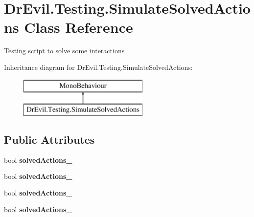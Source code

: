 \hypertarget{class_dr_evil_1_1_testing_1_1_simulate_solved_actions}{}\section{Dr\+Evil.\+Testing.\+Simulate\+Solved\+Actions Class Reference}
\label{class_dr_evil_1_1_testing_1_1_simulate_solved_actions}


\mbox{\hyperlink{namespace_dr_evil_1_1_testing}{Testing}} script to solve some interactions  


Inheritance diagram for Dr\+Evil.\+Testing.\+Simulate\+Solved\+Actions\+:\begin{figure}[H]
\begin{center}
\leavevmode
\includegraphics[height=2.000000cm]{class_dr_evil_1_1_testing_1_1_simulate_solved_actions}
\end{center}
\end{figure}
\subsection*{Public Attributes}
\begin{DoxyCompactItemize}
\item 
\mbox{\label{class_dr_evil_1_1_testing_1_1_simulate_solved_actions_a53654f671e69ea2709f8d25a4bb50ea2}} 
bool {\bfseries solved\+Actions\+\_}
\item 
\mbox{\label{class_dr_evil_1_1_testing_1_1_simulate_solved_actions_a1a5d2f9cee3771edff92744a1ee5404e}} 
bool {\bfseries solved\+Actions\+\_}
\item 
\mbox{\label{class_dr_evil_1_1_testing_1_1_simulate_solved_actions_a243180a66c0e65e12fdad6a51c398181}} 
bool {\bfseries solved\+Actions\+\_}
\item 
\mbox{\label{class_dr_evil_1_1_testing_1_1_simulate_solved_actions_a61d5ff24eb8b4671fa6bbdb69c76c300}} 
bool {\bfseries solved\+Actions\+\_}
\end{DoxyCompactItemize}


